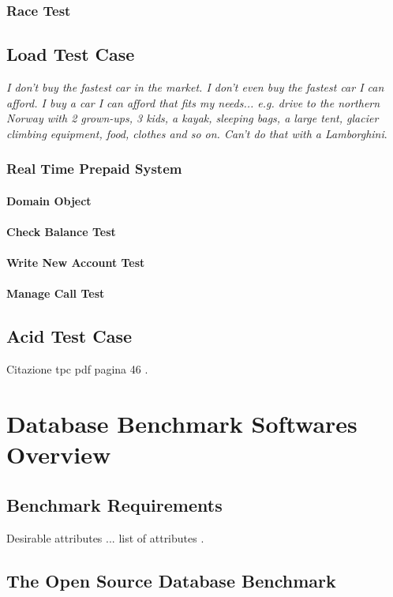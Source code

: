 		\subsection{Race Test}
	\section{Load Test Case}
\emph{I don't buy the fastest car in the market. I don't even buy the fastest car I can afford. I buy a car I can afford that fits my needs... e.g. drive to the northern Norway with 2 grown-ups, 3 kids, a kayak, sleeping bags, a large tent, glacier climbing equipment, food, clothes and so on. Can't do that with a Lamborghini}\cite{Bernt}.

		\subsection{Real Time Prepaid System}
			\subsubsection{Domain Object}
			\subsubsection{Check Balance Test}
			\subsubsection{Write New Account Test}
			\subsubsection{Manage Call Test}
	\section{Acid Test Case}
Citazione tpc pdf pagina 46 \cite{TPC-C}.

\chapter{Database Benchmark Softwares Overview}
	\section{Benchmark Requirements}
Desirable attributes ... list of attributes \cite{tpc/sigmoid}.
	
	\section{The Open Source Database Benchmark}

